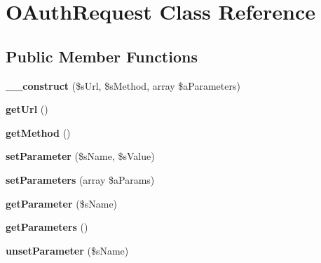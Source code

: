 \hypertarget{class_o_auth_request}{\section{O\-Auth\-Request Class Reference}
\label{class_o_auth_request}
}
\subsection*{Public Member Functions}
\begin{DoxyCompactItemize}
\item 
\hypertarget{class_o_auth_request_a3260af42464ad004673d43b901a8236e}{{\bfseries \-\_\-\-\_\-construct} (\$s\-Url, \$s\-Method, array \$a\-Parameters)}\label{class_o_auth_request_a3260af42464ad004673d43b901a8236e}

\item 
\hypertarget{class_o_auth_request_ad7c67c989cb1be5e645368ac09a7f877}{{\bfseries get\-Url} ()}\label{class_o_auth_request_ad7c67c989cb1be5e645368ac09a7f877}

\item 
\hypertarget{class_o_auth_request_a4f5e460a2691de04aaceb42a8f81927d}{{\bfseries get\-Method} ()}\label{class_o_auth_request_a4f5e460a2691de04aaceb42a8f81927d}

\item 
\hypertarget{class_o_auth_request_af4c06164c27d3f70552cf65efe8f555a}{{\bfseries set\-Parameter} (\$s\-Name, \$s\-Value)}\label{class_o_auth_request_af4c06164c27d3f70552cf65efe8f555a}

\item 
\hypertarget{class_o_auth_request_a9d9998a9f1f96cf941158d054f2a01e4}{{\bfseries set\-Parameters} (array \$a\-Params)}\label{class_o_auth_request_a9d9998a9f1f96cf941158d054f2a01e4}

\item 
\hypertarget{class_o_auth_request_ad748521c45f8e8795c9557a9196be7cf}{{\bfseries get\-Parameter} (\$s\-Name)}\label{class_o_auth_request_ad748521c45f8e8795c9557a9196be7cf}

\item 
\hypertarget{class_o_auth_request_ad73494ac494c08c196d7bb89c5b86fb0}{{\bfseries get\-Parameters} ()}\label{class_o_auth_request_ad73494ac494c08c196d7bb89c5b86fb0}

\item 
\hypertarget{class_o_auth_request_ac3aa92e4af3dbae8aa5753c5c5615093}{{\bfseries unset\-Parameter} (\$s\-Name)}\label{class_o_auth_request_ac3aa92e4af3dbae8aa5753c5c5615093}


\end{DoxyCompactItemize}
